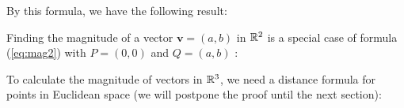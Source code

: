 By this formula, we have the following result:

\medskip
{}

Finding the magnitude of a vector $\mathbf{v} = (a,b)$ in $\mathbb{R}^{2}$ is a
special case of formula (\ref{eq:mag2}) with $P = (0,0)$ and $Q = (a,b)$ :

\medskip
{}
\smallskip

To calculate the magnitude of vectors in $\mathbb{R}^{3}$, we need a distance formula for points in Euclidean
space (we will postpone the proof until the next section):

